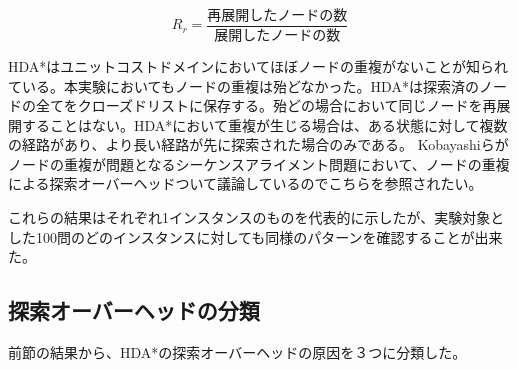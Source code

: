 \documentclass[uplatex]{jsarticle}
\begin{document}
\begin{equation}
	R_{r} = \frac{再展開したノードの数}{展開したノードの数}
\end{equation}
\newline

HDA*はユニットコストドメインにおいてほぼノードの重複がないことが知られている\cite{Kishimoto2013}。本実験においてもノードの重複は殆どなかった。HDA*は探索済のノードの全てをクローズドリストに保存する。殆どの場合において同じノードを再展開することはない。HDA*において重複が生じる場合は、ある状態に対して複数の経路があり、より長い経路が先に探索された場合のみである。%
Kobayashiらがノードの重複が問題となるシーケンスアライメント問題において、ノードの重複による探索オーバーヘッドついて議論しているのでこちらを参照されたい\cite{kobayashi2011evaluations}。

これらの結果はそれぞれ1インスタンスのものを代表的に示したが、実験対象とした100問のどのインスタンスに対しても同様のパターンを確認することが出来た。


\subsection{探索オーバーヘッドの分類}

前節の結果から、HDA*の探索オーバーヘッドの原因を３つに分類した。
\end{document}
